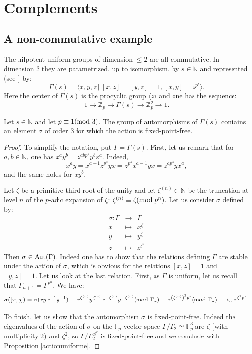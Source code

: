 \documentclass[12pt,a4paper,twoside,english]{smfart}
\def\Z{{\mathbb Z}}
\def\fq{{\mathbb F}}
\def\Nat{{\mathbb N}}
\def\Aut{{\rm Aut}}
\def\mod{{\rm mod}}
\def\act#1{{\displaystyle{#1^{\circlearrowleft^\sigma}}}}
\begin{document}
 \section{Complements}
 
 \subsection{A non-commutative example} \label{exemplenoncommutatif}
 
 
 The nilpotent uniform groups of dimension $\leq 2$ are all commutative. In dimension $3$ they are parametrized, up to isomorphism,
 by $s\in \Nat$ and represented (see \cite[\S 7 Theorem 7.4]{sanchez-klopsch}) by: $$\Gamma(s) = \langle x,y,z  \ | \ [x,z]=[y,z]=1, [x,y]=z^{p^s}\rangle.$$
 Here the center of $\Gamma(s)$ is the procyclic group $\langle z\rangle$ and one has the sequence:$$1\longrightarrow \Z_p \longrightarrow \Gamma(s) \longrightarrow \Z_p^2 \longrightarrow 1.$$

 \begin{prop} Let $s\in \Nat$ and let $p \equiv 1 (\mod \ 3)$.
  The group of automorphisms of $\Gamma(s)$ contains an element $\sigma$ of order $3$ for which the action is fixed-point-free.
 \end{prop}
 


 \begin{proof} To simplify the notation, put $\Gamma=\Gamma(s)$.
  First, let us remark that for  $a,b \in \Nat$,  one has $x^ay^b= z^{abp^s}y^bx^a$. Indeed,
 $$x^ay=x^{a-1}z^{p^s}yx=z^{p^s}x^{a-1}yx=z^{ap^s}yx^a,$$
 and the same holds for $xy^b$.

 Let $\zeta$ be a primitive  third root of the unity and let  $\zeta^{(n)} \in \Nat$ be the truncation at level $n$ of the $p$-adic expansion of $\zeta$:
 $\zeta^{(n)} \equiv \zeta  (\mod \ p^n)$.
 Let us consider $\sigma$ defined by: 
 $$\begin{array}{rcl} \sigma : \Gamma &\rightarrow & \Gamma\\
    x& \mapsto & x^\zeta \\
    y & \mapsto & y^\zeta \\
    z & \mapsto & z^{\zeta^2}
   \end{array}$$
   Then $\sigma \in \Aut(\Gamma)$. Indeed one has to show that the relations defining $\Gamma$ are stable under the action of $\sigma$, which is obvious for the relations $[x,z]=1$ and $[y,z]=1$. 
  Let us look at the last relation. First, as $\Gamma$ is uniform,  let us recall that  $\Gamma_{n+1}=\Gamma^{p^n}$.
  We have: $$\sigma([x,y])=\sigma(xyx^{-1}y^{-1})\equiv x^{\zeta^{(n)}}y^{\zeta^{(n)}} x^{-\zeta^{(n)}}y^{-\zeta^{(n)}} (\mod \ \Gamma_n)
   \equiv z^{\left(\zeta^{(n)}\right)^2 p^s} (\mod \ \Gamma_n) \longrightarrow_{n} z^{\zeta^2 p^s}.$$
   
  To finish, let us show that the automorphism $\sigma$ is fixed-point-free.  Indeed the eigenvalues of the action of  $\sigma$ on the $\fq_p$-vector space $\Gamma/\Gamma_2\simeq \fq_p^3$  are 
   $\zeta$ (with multiplicity $2$) and $\zeta^2$, so $\act{\Gamma/\Gamma_2}$ is fixed-point-free and we conclude with Proposition \ref{actionuniforme}.
 \end{proof}
\end{document}
